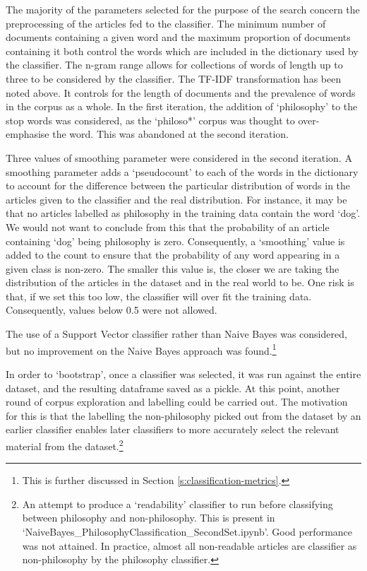 \documentclass{article}
\begin{document}
The majority of the parameters selected for the purpose of the search concern the preprocessing of the articles fed to the classifier. The minimum number of documents containing a given word and the maximum proportion of documents containing it both control the words which are included in the dictionary used by the classifier. The n-gram range allows for collections of words of length up to three to be considered by the classifier. The TF-IDF transformation has been noted above. It controls for the length of documents and the prevalence of words in the corpus as a whole. In the first iteration, the addition of `philosophy' to the stop words was considered, as the `philoso*' corpus was thought to over-emphasise the word. This was abandoned at the second iteration.

Three values of smoothing parameter were considered in the second iteration. A smoothing parameter adds a `pseudocount' to each of the words in the dictionary to account for the difference between the particular distribution of words in the articles given to the classifier and the real distribution. For instance, it may be that no articles labelled as philosophy in the training data contain the word `dog'. We would not want to conclude from this that the probability of an article containing `dog' being philosophy is zero. Consequently, a `smoothing' value is added to the count to ensure that the probability of any word appearing in a given class is non-zero. The smaller this value is, the closer we are taking the distribution of the articles in the dataset and in the real world to be. One risk is that, if we set this too low, the classifier will over fit the training data. Consequently, values below 0.5 were not allowed.

The use of a Support Vector classifier rather than Naive Bayes was considered, but no improvement on the Naive Bayes approach was found.\footnote{This is further discussed in Section \ref{s:classification-metrics}.}

In order to `bootstrap', once a classifier was selected, it was run against the entire dataset, and the resulting dataframe saved as a pickle. At this point, another round of corpus exploration and labelling could be carried out. The motivation for this is that the labelling the non-philosophy picked out from the dataset by an earlier classifier enables later classifiers to more accurately select the relevant material from the dataset.\footnote{An attempt to produce a `readability' classifier to run before classifying between philosophy and non-philosophy. This is present in `NaiveBayes\_\-PhilosophyClassification\_\-SecondSet.ipynb'. Good performance was not attained. In practice, almost all non-readable articles are classifier as non-philosophy by the philosophy classifier.}
\end{document}
